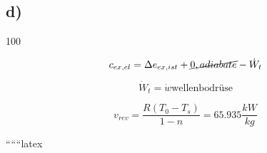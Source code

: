 

\subsection*{d)}
 100 


\[
c_{ex, el} = \Delta e_{ex, ist} + \cancel{0, adiabate} - \dot{W}_t
\]

\[
\dot{W}_t = \dot{w} \text{wellenbodrüse}
\]

\[
v_{rev} = \frac{R (T_0 - T_s)}{1 - n} = 65.935 \frac{kW}{kg}
\]

``````latex